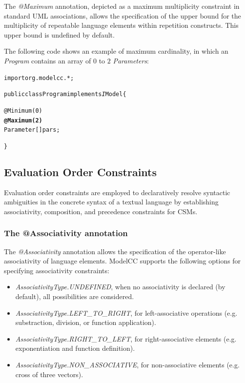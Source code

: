 \documentclass[a4paper,twoside,onecolumn]{article}
\newenvironment{colframe}{%
  \begin{Sbox} 
    \begin{minipage}{.8\columnwidth} 
}{%

  \end{minipage} 
  \end{Sbox} 
  \begin{center} 
    \fcolorbox{black}{MyGray}{\TheSbox} 
  \end{center} 
}
\newcommand{\an}[1]{\emph{#1}} %
\begin{document}
The \an{@Maximum} annotation, depicted as a maximum multiplicity constraint in standard UML associations, allows the specification of the upper
bound for the multiplicity of repeatable language elements within repetition constructs. This upper bound is undefined by default.

The following code shows an example of maximum cardinality, in which an \emph{Program} contains an array of $0$ to $2$ \emph{Parameters}:

\begin{colframe}
\begin{alltt}
import org.modelcc.*;

public class Program implements{\emph IModel} \{

  @Minimum(0)
  {\bf @Maximum(2)}
  Parameter[] pars;

\}
\end{alltt}
\end{colframe}

\subsection{Evaluation Order Constraints}

Evaluation order constraints are employed to declaratively resolve syntactic ambiguities in the concrete syntax of a textual language by establishing associativity, composition, and precedence constraints for CSMs.

\subsubsection{The @Associativity annotation}

The \an{@Associativity} annotation allows the specification of the operator-like associativity of language elements. ModelCC supports the
following options for specifying associativity constraints:
%
\begin{itemize}
%
%
\item \an{AssociativityType.UNDEFINED}, when no associativity is declared (by default), all possibilities are considered.
%
%
\item \an{AssociativityType.LEFT\_TO\_RIGHT}, for left-associative operations (e.g. substraction, division, or function application).
%
%
\item \an{AssociativityType.RIGHT\_TO\_LEFT}, for right-associative elements (e.g. exponentiation and function definition).
%
%
\item \an{AssociativityType.NON\_ASSOCIATIVE}, for non-associative elements (e.g. cross of three vectors).
%
\end{itemize}
\end{document}
